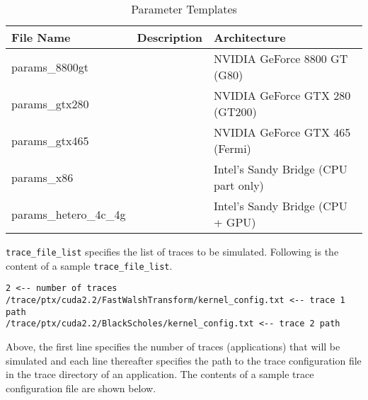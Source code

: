 
\begin{table}
\begin{footnotesize}
\begin{center}
\caption{Parameter Templates}
\label{table:param}
\begin{tabular}{|l|l|l|}
\hline
File Name              & Description & Architecture                         \\ \hline \hline
params\_8800gt         &             & NVIDIA GeForce 8800 GT (G80)         \\
params\_gtx280         &             & NVIDIA GeForce GTX 280 (GT200)       \\
params\_gtx465         &             & NVIDIA GeForce GTX 465 (Fermi)       \\
params\_x86            &             & Intel's Sandy Bridge (CPU part only) \\
params\_hetero\_4c\_4g &             & Intel's Sandy Bridge (CPU + GPU)     \\ \hline
\end{tabular}
\end{center}
\end{footnotesize}
\end{table}


\Verb+trace_file_list+ specifies the list of traces to be simulated. Following is the
content of a sample \Verb+trace_file_list+.

\begin{Verbatim}
2 <-- number of traces
/trace/ptx/cuda2.2/FastWalshTransform/kernel_config.txt <-- trace 1 path
/trace/ptx/cuda2.2/BlackScholes/kernel_config.txt <-- trace 2 path
\end{Verbatim}

\noindent

Above, the first line specifies the number of traces (applications) that will
be simulated and each line thereafter specifies the path to the trace
configuration file in the trace directory of an application. The contents of a
sample trace configuration file are shown below.

